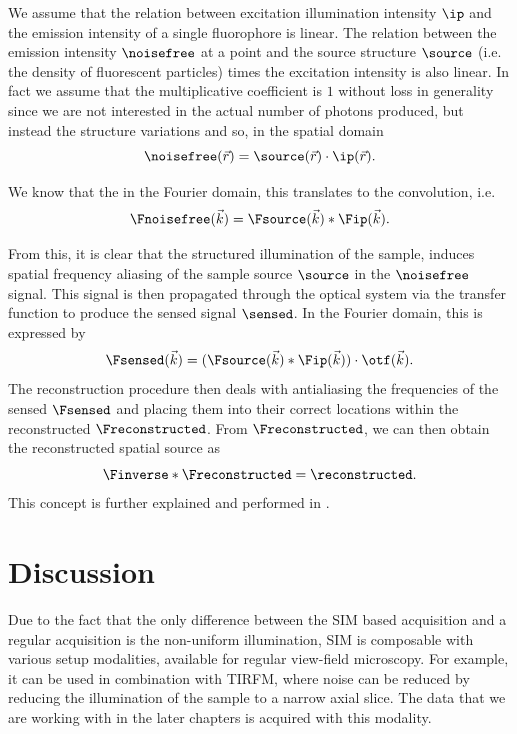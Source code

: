 We assume that the relation between excitation illumination intensity \(\ip\) and the emission intensity of a single 
    fluorophore is linear.
The relation between the emission intensity \(\noisefree\) at a point and the source structure \(\source\) (i.e. the 
    density of fluorescent particles) times the excitation intensity is also linear.
In fact we assume that the multiplicative coefficient is \(1\) without loss in generality since we are not interested in
    the actual number of photons produced, but instead the structure variations and so, in the spatial domain
    \begin{equation*}
      \noisefree(\vec{r}) = \source(\vec{r}) \cdot \ip(\vec{r}).
    \end{equation*}

We know that the in the Fourier domain, this translates to the convolution, i.e.
    \begin{equation*}
      \Fnoisefree(\vec{k}) = \Fsource(\vec{k}) * \Fip(\vec{k}).
    \end{equation*}

From this, it is clear that the structured illumination of the sample, induces spatial frequency aliasing of the sample
    source \(\source\) in the \(\noisefree\) signal.
This signal is then propagated through the optical system via the transfer function to produce the sensed signal
    \(\sensed\).
In the Fourier domain, this is expressed by
    \begin{equation*}
      \Fsensed(\vec{k}) = (\Fsource(\vec{k}) * \Fip(\vec{k})) \cdot \otf(\vec{k}).
    \end{equation*}
The reconstruction procedure then deals with antialiasing the frequencies of the sensed \(\Fsensed\) and placing them 
    into their correct locations within the reconstructed \(\Freconstructed\).
From \(\Freconstructed\), we can then obtain the reconstructed spatial source as 
    \begin{equation*}
        \Finverse*{\Freconstructed} = \reconstructed .
    \end{equation*}
This concept is further explained and performed in . 

\section{Discussion}

Due to the fact that the only difference between the \ac{SIM} based acquisition and a regular acquisition is the
    non-uniform illumination, \ac{SIM} is composable with various setup modalities, available for regular view-field
    microscopy.
For example, it can be used in combination with \ac{TIRFM}, where noise can be reduced by reducing the illumination of
    the sample to a narrow axial slice.
The data that we are working with in the later chapters is acquired with this modality.

